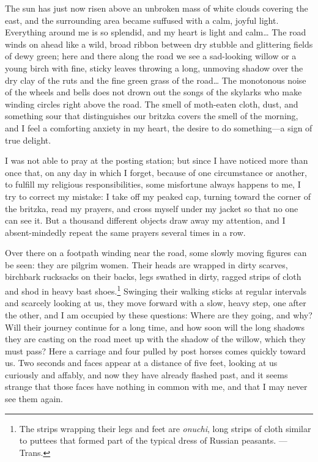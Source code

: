 The sun has just now risen above an unbroken mass of white clouds covering the east, and the surrounding area became suffused with a calm, joyful light. Everything around me is so splendid, and my heart is light and calm\ldots{} The road winds on ahead like a wild, broad ribbon between dry stubble and glittering fields of dewy green; here and there along the road we see a sad-looking willow or a young birch with fine, sticky leaves throwing a long, unmoving shadow over the dry clay of the ruts and the fine green grass of the road\ldots{} The monotonous noise of the wheels and bells does not drown out the songs of the skylarks who make winding circles right above the road. The smell of moth-eaten cloth, dust, and something sour that distinguishes our britzka covers the smell of the morning, and I feel a comforting anxiety in my heart, the desire to do something---a sign of true delight.

I was not able to pray at the posting station; but since I have noticed more than once that, on any day in which I forget, because of one circumstance or another, to fulfill my religious responsibilities, some misfortune always happens to me, I try to correct my mistake: I take off my peaked cap, turning toward the corner of the britzka, read my prayers, and cross myself under my jacket so that no one can see it. But a thousand different objects draw away my attention, and I absent-mindedly repeat the same prayers several times in a row.

Over there on a footpath winding near the road, some slowly moving figures can be seen: they are pilgrim women. Their heads are wrapped in dirty scarves, birchbark rucksacks on their backs, legs swathed in dirty, ragged strips of cloth and shod in heavy bast shoes.\footnote{The strips wrapping their legs and feet are \textit{onuchi}, long strips of cloth similar to puttees that formed part of the typical dress of Russian peasants. --- Trans.} Swinging their walking sticks at regular intervals and scarcely looking at us, they move forward with a slow, heavy step, one after the other, and I am occupied by these questions: Where are they going, and why? Will their journey continue for a long time, and how soon will the long shadows they are casting on the road meet up with the shadow of the willow, which they must pass? Here a carriage and four pulled by post horses comes quickly toward us. Two seconds and faces appear at a distance of five feet, looking at us curiously and affably, and now they have already flashed past, and it seems strange that those faces have nothing in common with me, and that I may never see them again.


